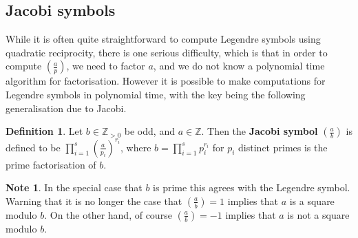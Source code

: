 \documentclass{article}
\newcommand{\Z}{\mathbb{Z}}
\newcommand{\rb}[1]{\left( #1 \right)}
\newcommand{\legendre}[2]{\rb{\tfrac{#1}{#2}}}
\theoremstyle{definition}\newtheorem{definition}{Definition}
\theoremstyle{definition}\newtheorem*{remark}{Remark}
\theoremstyle{definition}\newtheorem*{example}{Example}
\theoremstyle{definition}\newtheorem*{note}{Note}
\begin{document}
\subsection{Jacobi symbols}

While it is often quite straightforward to compute Legendre symbols using quadratic reciprocity, there is one serious difficulty, which is that in order to compute $ \legendre{a}{p} $, we need to factor $ a $, and we do not know a polynomial time algorithm for factorisation. However it is possible to make computations for Legendre symbols in polynomial time, with the key being the following generalisation due to Jacobi.

\begin{definition}
Let $ b \in \Z_{> 0} $ be odd, and $ a \in \Z $. Then the \textbf{Jacobi symbol} $ \legendre{a}{b} $ is defined to be $ \prod_{i = 1}^s \legendre{a}{p_i}^{r_i} $, where $ b = \prod_{i = 1}^s p_i^{r_i} $ for $ p_i $ distinct primes is the prime factorisation of $ b $.
\end{definition}

\begin{note}
In the special case that $ b $ is prime this agrees with the Legendre symbol. Warning that it is no longer the case that $ \legendre{a}{b} = 1 $ implies that $ a $ is a square modulo $ b $. On the other hand, of course $ \legendre{a}{b} = -1 $ implies that $ a $ is not a square modulo $ b $.
\end{note}
\end{document}
